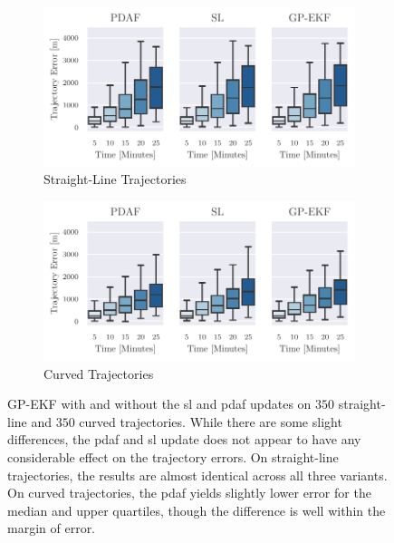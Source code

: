 \begin{figure}[h]
    \centering
    \begin{subfigure}{1\textwidth}
        \includegraphics[width=\textwidth]{figures/straight_line_stats/gp_vs_update.pdf}
        \caption{Straight-Line Trajectories}
    \end{subfigure}
    \begin{subfigure}{1\textwidth}
        \includegraphics[width=\textwidth]{figures/curved_line_stats/gp_vs_update.pdf}
        \caption{Curved Trajectories}
    \end{subfigure}
    \caption{GP-EKF with and without the \acrshort{sl} and \acrshort{pdaf} updates on $350$ straight-line and $350$ curved trajectories. While there are some slight differences, the \acrshort{pdaf} and \acrshort{sl} update does not appear to have any considerable effect on the trajectory errors. On straight-line trajectories, the results are almost identical across all three variants. On curved trajectories, the \acrshort{pdaf} yields slightly lower error for the median and upper quartiles, though the difference is well within the margin of error.}
    \label{fig:stats_gp_ekf_with_or_without_update}
\end{figure}

